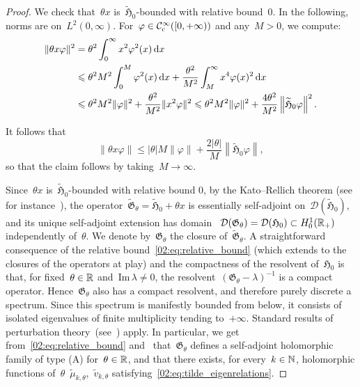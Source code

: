    \begin{proof}
    We check that~$\theta x$ is~$\widetilde{\mathfrak H}_0$-bounded with relative bound~$0$. In the following, norms are on~$L^2(0,\infty)$. For~$\varphi \in \mathcal{C}^\infty_{\mathrm{c}}([0,+\infty))$ and any~$M>0$, we compute:
    \begin{equation}
        \begin{aligned}
            \|\theta x\varphi\|^2 &= \theta^2\int_0^\infty x^2\varphi^2(x)\,\mathrm{d} x\\
            &\leqslant \theta^2 M^2\int_0^M \varphi^2(x)\,\mathrm{d} x + \frac{\theta^2}{M^2}\int_M^\infty x^4\varphi(x)^2\,\mathrm{d} x\\
            &\leqslant \theta^2 M^2\|\varphi\|^2 + \frac{\theta^2}{M^2}\|x^2\varphi\|^2 \leqslant \theta^2 M^2\|\varphi\|^2 + \frac{4\theta^2}{M^2}\left\|\widetilde{\mathfrak H}_0 \varphi\right\|^2.\\
        \end{aligned}
    \end{equation}

    It follows that
    \begin{equation}
        \label{02:eq:relative_bound}
        \|\theta x \varphi\| \leq |\theta|M\|\varphi\| + \frac{2|\theta|}M \left\| \widetilde{\mathfrak H}_0 \varphi\right\|,
    \end{equation}
    so that the claim follows by taking~$M\to \infty$.

    Since~$\theta x$ is~$\widetilde{\mathfrak H}_0$-bounded with relative bound 0, by the Kato--Rellich theorem (see for instance~\cite[Theorem 6.4]{T14}), the operator~$\widetilde{\mathfrak{G}}_\theta=\widetilde{\mathfrak H}_0 + \theta x$ is essentially self-adjoint on~$\mathcal D({\widetilde{\mathfrak{H}}}_0)$, and its unique self-adjoint extension has domain~
    $\mathcal D(\mathfrak{G}_\theta) = \mathcal D({\mathfrak{H}_0})\subset H_0^1(\mathbb{R}_+)$ independently of~$\theta$.
    We denote by~$\mathfrak{G}_\theta$ the closure of~${\widetilde{\mathfrak{G}}}_\theta$.
    A straightforward consequence of the relative bound~\eqref{02:eq:relative_bound} (which extends to the closures of the operators at play) and the compactness of the resolvent of~$\mathfrak{H}_0$ is that, for fixed~$\theta\in \mathbb{R}$ and~$\mathrm{Im}\,\lambda \neq 0$, the resolvent~$(\mathfrak{G}_\theta-\lambda)^{-1}$ is a compact operator. Hence~${\mathfrak G}_\theta$ also has a compact resolvent, and therefore purely discrete a spectrum. Since this spectrum is manifestly bounded from below, it consists of isolated eigenvalues of finite multiplicity tending to~$+\infty$.
    Standard results of perturbation theory~(see~\cite[Chapter VII]{K95}) apply. In particular, we get from~\eqref{02:eq:relative_bound} and~\cite[Theorems VII.2.6 and VII.3.9]{K95} that~${\mathfrak G}_\theta$ defines a self-adjoint holomorphic family of type (A) for~$\theta\in\mathbb{R}$, and that there exists, for every~$k\in\mathbb{N}$, holomorphic functions of~$\theta$~$\widetilde\mu_{k,\theta}$,~$\widetilde v_{k,\theta}$ satisfying~\eqref{02:eq:tilde_eigenrelations}.
    \end{proof}

